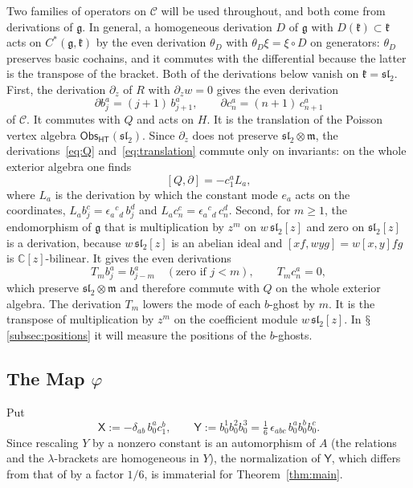 \documentclass[11pt]{amsart}
\numberwithin{equation}{section}
\renewcommand{\S}{\mbox{$\mathsection$}}
\theoremstyle{definition}
\theoremstyle{remark}
\newcommand{\C}{\mathbb{C}}
\newcommand{\g}{\mathfrak{g}}
\newcommand{\sltwo}{\mathfrak{sl}_2}
\newcommand{\dd}{\partial}
\newcommand{\Obs}{\mathsf{Obs}_{\mathsf{HT}}}
\newcommand{\cC}{\mathcal{C}}
\newcommand{\Xc}{\mathsf{X}}
\newcommand{\Yc}{\mathsf{Y}}
\begin{document}
Two families of operators on $\cC$ will be used throughout, and both come from derivations of $\g$. In general, a homogeneous derivation $D$ of $\g$ with $D(\mathfrak k)\subset\mathfrak k$ acts on $C^*(\g,\mathfrak k)$ by the even derivation $\theta_D$ with $\theta_D\xi=\xi\circ D$ on generators: $\theta_D$ preserves basic cochains, and it commutes with the differential because the latter is the transpose of the bracket. Both of the derivations below vanish on $\mathfrak k=\sltwo$. First, the derivation $\dd_z$ of $R$ with $\dd_zw=0$ gives the even derivation
\begin{equation}\label{eq:translation}
\dd b_j^a=(j+1)\,b_{j+1}^a,\qquad \dd c_n^a=(n+1)\,c_{n+1}^a
\end{equation}
of $\cC$. It commutes with $Q$ and acts on $H$. It is the translation of the Poisson vertex algebra $\Obs(\sltwo)$. Since $\dd_z$ does not preserve $\sltwo\otimes\mathfrak m$, the derivations~\eqref{eq:Q} and~\eqref{eq:translation} commute only on invariants: on the whole exterior algebra one finds
\begin{equation}\label{eq:Q-translation}
[Q,\dd]=-c_1^aL_a,
\end{equation}
where $L_a$ is the derivation by which the constant mode $e_a$ acts on the coordinates, $L_ab_j^c=\epsilon_a{}^c{}_d\,b_j^d$ and $L_ac_n^c=\epsilon_a{}^c{}_d\,c_n^d$. Second, for $m\ge1$, the endomorphism of $\g$ that is multiplication by $z^m$ on $w\,\sltwo[z]$ and zero on $\sltwo[z]$ is a derivation, because $w\,\sltwo[z]$ is an abelian ideal and $[xf,wyg]=w[x,y]fg$ is $\C[z]$-bilinear. It gives the even derivations
\begin{equation}\label{eq:T}
T_mb_j^a=b_{j-m}^a\quad(\text{zero if }j<m),\qquad T_mc_n^a=0,
\end{equation}
which preserve $\sltwo\otimes\mathfrak m$ and therefore commute with $Q$ on the whole exterior algebra. The derivation $T_m$ lowers the mode of each $b$-ghost by $m$. It is the transpose of multiplication by $z^m$ on the coefficient module $w\,\sltwo[z]$. In \S\ref{subsec:positions} it will measure the positions of the $b$-ghosts.

\subsection{The Map \texorpdfstring{$\varphi$}{phi}}\label{subsec:phi}
Put
\begin{equation}\label{eq:XY}
\Xc:=-\delta_{ab}\,b_0^ac_1^b,\qquad \Yc:=b_0^1b_0^2b_0^3=\tfrac16\,\epsilon_{abc}\,b_0^ab_0^bb_0^c .
\end{equation}
Since rescaling $Y$ by a nonzero constant is an automorphism of $A$ (the relations and the $\lambda$-brackets are homogeneous in $Y$), the normalization of $\Yc$, which differs from that of \cite{Kha26} by a factor $1/6$, is immaterial for Theorem~\ref{thm:main}.
\end{document}
